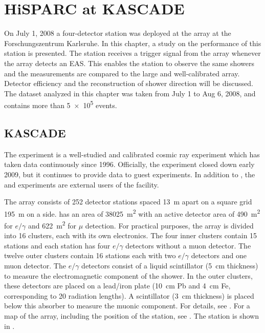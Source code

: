 \chapter{HiSPARC at KASCADE}
\label{ch:kascade}

On July 1, 2008 a four-detector \hisparc station was deployed at the \kascade
array at the Forschungszentrum Karlsruhe.  In this chapter, a study on the
performance of this \hisparc station is presented.
The \hisparc station receives a trigger signal from the \kascade array whenever
the array detects an EAS. This enables the \hisparc station to observe the same
showers and the \hisparc measurements are compared to the large and
well-calibrated \kascade array.  Detector efficiency and the
reconstruction of shower direction will be discussed.  The dataset analyzed in
this chapter was taken from July 1 to Aug 6, 2008, and contains more than
\num{5e5} events.


\section{KASCADE}

The \kascade experiment \cite{Antoni:2003gd} is a well-studied and calibrated
cosmic ray experiment which has taken data continuously since 1996.  Officially,
the experiment closed down early 2009, but it continues to provide data to
guest experiments.  In addition to \hisparc, the 
\cite{Badea:2004un} and  \cite{Iori:2009} experiments are
external users of the \kascade facility.

The array consists of 252 detector stations spaced \SI{13}{\meter} apart on a
square grid \SI{195}{\meter} on a side. \kascade has an area of
\SI{38025}{\square\meter} with an active detector area of
\SI{490}{\square\meter} for $e/\gamma$ and \SI{622}{\square\meter} for $\mu$
detection.
For practical purposes, the array is divided into 16 clusters, each with its own
\daq electronics.  The four inner clusters contain 15 stations and each station
has four $e/\gamma$ detectors without a muon detector.  The twelve outer
clusters contain 16 stations each with two $e/\gamma$ detectors and one muon
detector. The $e/\gamma$ detectors consist of a liquid scintillator
(\SI{5}{\centi\meter} thickness) to measure the electromagnetic component of the
shower.  In the outer clusters, these detectors are placed on a lead/iron plate
(\SI{10}{\centi\meter} Pb and \SI{4}{\centi\meter} Fe, corresponding to 20
radiation lengths).  A scintillator (\SI{3}{\centi\meter} thickness) is placed
below this absorber to measure the muonic component. For details, see
\cite{Antoni:2003gd}.  For a map of the \kascade array, including the
position of the \hisparc station, see .  The station is
shown in .

